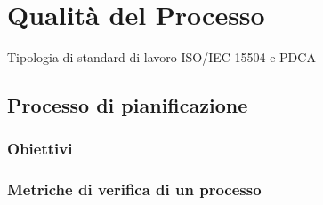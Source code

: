 \section{Qualità del Processo}
Tipologia di standard di lavoro ISO/IEC 15504 e PDCA
\subsection{Processo di pianificazione}
\subsubsection{Obiettivi}
\subsubsection{Metriche di verifica di un processo}










